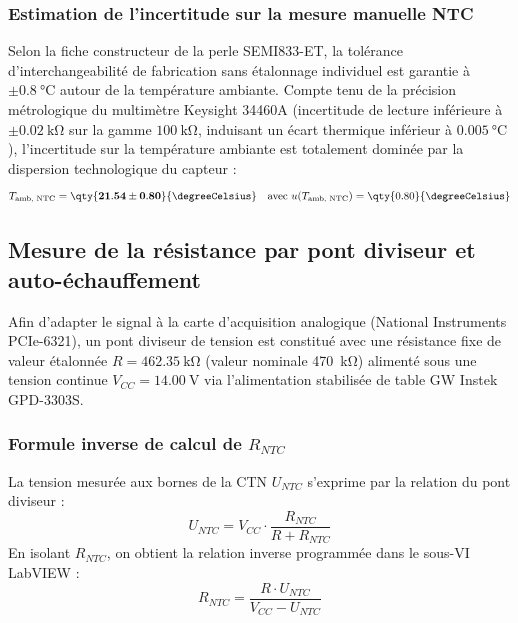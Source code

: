 \subsubsection*{Estimation de l'incertitude sur la mesure manuelle NTC}
Selon la fiche constructeur de la perle SEMI833-ET, la tolérance d'interchangeabilité de fabrication sans étalonnage individuel est garantie à $\pm \qty{0.8}{\degreeCelsius}$ autour de la température ambiante. Compte tenu de la précision métrologique du multimètre Keysight 34460A (incertitude de lecture inférieure à $\pm \qty{0.02}{\kilo\ohm}$ sur la gamme $\qty{100}{\kilo\ohm}$, induisant un écart thermique inférieur à $\qty{0.005}{\degreeCelsius}$), l'incertitude sur la température ambiante est totalement dominée par la dispersion technologique du capteur :
\begin{equation}
    T_{\text{amb, NTC}} = \mathbf{\qty{21.54 \pm 0.80}{\degreeCelsius}} \quad \text{avec } u(T_{\text{amb, NTC}}) = \qty{0.80}{\degreeCelsius}
\end{equation}

\subsection{Mesure de la résistance par pont diviseur et auto-échauffement}
\label{subsec:ntc_pont}

Afin d'adapter le signal à la carte d'acquisition analogique (National Instruments PCIe-6321), un pont diviseur de tension est constitué avec une résistance fixe de valeur étalonnée $R = \qty{462.35}{\kilo\ohm}$ (valeur nominale \qty{470}{\kilo\ohm}) alimenté sous une tension continue $V_{CC} = \qty{14.00}{\volt}$ via l'alimentation stabilisée de table GW Instek GPD-3303S.

\subsubsection*{Formule inverse de calcul de $R_{NTC}$}
La tension mesurée aux bornes de la CTN $U_{NTC}$ s'exprime par la relation du pont diviseur :
\begin{equation}
    U_{NTC} = V_{CC} \cdot \frac{R_{NTC}}{R + R_{NTC}}
\end{equation}
En isolant $R_{NTC}$, on obtient la relation inverse programmée dans le sous-VI LabVIEW :
\begin{equation}
    R_{NTC} = \frac{R \cdot U_{NTC}}{V_{CC} - U_{NTC}}
    \label{eq:formule_rntc}
\end{equation}

